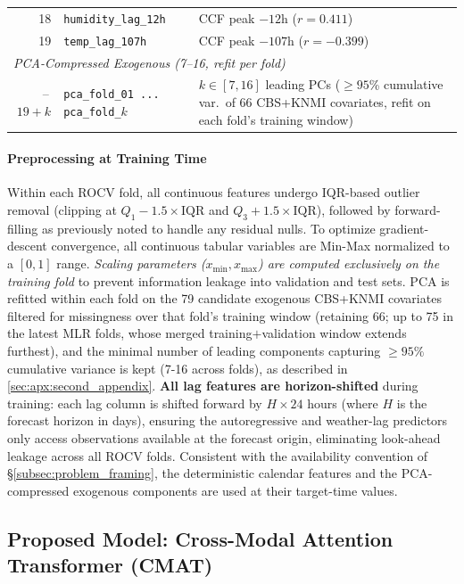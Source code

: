 \begin{table}[htbp]
\begin{tabularx}{\columnwidth}{r l X}
18 & \texttt{humidity\_lag\_12h}    & CCF peak $-12$h ($r = 0.411$) \\
19 & \texttt{temp\_lag\_107h}       & CCF peak $-107$h ($r = -0.399$) \\
\midrule
\multicolumn{3}{l}{\textit{PCA-Compressed Exogenous (7--16, refit per fold)}} \\
\addlinespace[2pt]
20\,--\,$19{+}k$ & \texttt{pca\_fold\_01\,...\,pca\_fold\_$k$} & $k \in [7, 16]$ leading PCs (${\geq}95$\% cumulative var.\ of 66 CBS+KNMI covariates, refit on each fold's training window) \\
\bottomrule
\end{tabularx}
\end{table}

\paragraph{Preprocessing at Training Time} Within each ROCV fold, all continuous features undergo IQR-based outlier removal (clipping at $Q_1 - 1.5 \times \text{IQR}$ and $Q_3 + 1.5 \times \text{IQR}$), followed by forward-filling as previously noted to handle any residual nulls. To optimize gradient-descent convergence, all continuous tabular variables are Min-Max normalized to a $[0, 1]$ range. \textit{Scaling parameters ($x_{\min}, x_{\max}$) are computed exclusively on the training fold} to prevent information leakage into validation and test sets. PCA is refitted within each fold on the 79 candidate exogenous CBS+KNMI covariates filtered for missingness over that fold's training window (retaining 66; up to 75 in the latest MLR folds, whose merged training$+$validation window extends furthest), and the minimal number of leading components capturing $\geq 95\%$ cumulative variance is kept (7-16 across folds), as described in \ref{sec:apx:second_appendix}. 
\textbf{All lag features are horizon-shifted} during training: each lag column is shifted forward by $H \times 24$ hours (where $H$ is the forecast horizon in days), ensuring the autoregressive and weather-lag predictors only access observations available at the forecast origin, eliminating look-ahead leakage across all ROCV folds. Consistent with the availability convention of §\ref{subsec:problem_framing}, the deterministic calendar features and the PCA-compressed exogenous components are used at their target-time values.


\subsection{Proposed Model: Cross-Modal Attention Transformer (CMAT)}
\label{subsec:cmat_model}

